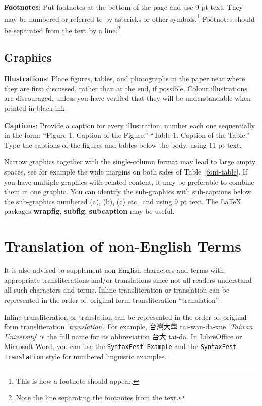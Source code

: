 \documentclass[11pt]{article}
\begin{document}
{\bf Footnotes}: Put footnotes at the bottom of the page and use 9 pt text. They may be numbered or referred to by asterisks or other symbols.\footnote{This is how a footnote should appear.} Footnotes should be separated from the text by a line.\footnote{Note the line separating the footnotes from the text.}


\subsection{Graphics}

{\bf Illustrations}: Place figures, tables, and photographs in the paper near where they are first discussed, rather than at the end, if possible. Colour illustrations are discouraged, unless you have verified that they will be understandable when printed in black ink.

{\bf Captions}: Provide a caption for every illustration; number each one sequentially in the form: ``Figure 1. Caption of the Figure.'' ``Table 1. Caption of the Table.'' Type the captions of the figures and tables below the body, using 11 pt text.

Narrow graphics together with the single-column format may lead to large empty spaces, see for example the wide margins on both sides of Table~\ref{font-table}. If you have multiple graphics with related content, it may be preferable to combine them in one graphic. You can identify the sub-graphics with sub-captions below the sub-graphics numbered (a), (b), (c) etc.\ and using 9 pt text. The LaTeX packages {\bf wrapfig}, {\bf subfig}, {\bf subcaption} may be useful.



\section{Translation of non-English Terms}

It is also advised to supplement non-English characters and terms with appropriate transliterations and/or translations
since not all readers understand all such characters and terms.
Inline transliteration or translation can be represented in
the order of: original-form transliteration ``translation''.

Inline transliteration or translation can be represented in the order of: original-form transliteration `\emph{translation}'. For example, 台灣大學 tai-wan-da-xue `\emph{Taiwan University}' is the full name for its abbreviation 台大 tai-da. In LibreOffice or Microsoft Word, you can use the {\tt SyntaxFest Example} and the {\tt SyntaxFest Translation} style for numbered linguistic examples.
\end{document}

